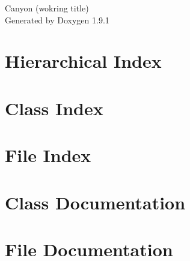 \let\mypdfximage\pdfximage\def\pdfximage{\immediate\mypdfximage}\documentclass[twoside]{book}
\newcommand{\+}{\discretionary{\mbox{\scriptsize$\hookleftarrow$}}{}{}}
\newcommand{\clearemptydoublepage}{%
  \newpage{\pagestyle{empty}\cleardoublepage}%
}
\begin{document}
\raggedbottom

\hypersetup{pageanchor=false,
             bookmarksnumbered=true,
             pdfencoding=unicode
            }
\begin{titlepage}
\vspace*{7cm}
\begin{center}%
{\Large Canyon (wokring title) }\\
\vspace*{1cm}
{\large Generated by Doxygen 1.9.1}\\
\end{center}
\end{titlepage}
\clearemptydoublepage
{}
\tableofcontents
\clearemptydoublepage
{}
\hypersetup{pageanchor=true}

\chapter{Hierarchical Index}

\chapter{Class Index}

\chapter{File Index}

\chapter{Class Documentation}












\chapter{File Documentation}


















\backmatter
\newpage
{}
\clearemptydoublepage
{}
\printindex
\end{document}
